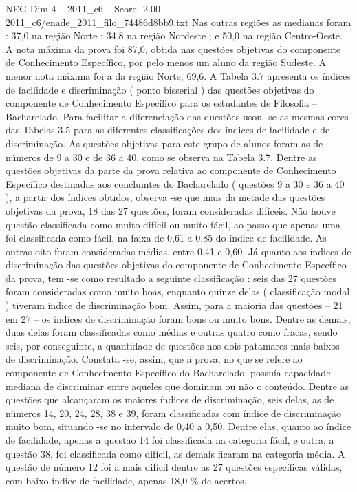 \begin{textsample}{NEG Dim 4 – 2011\_c6 – Score -2.00 – 2011\_c6/enade\_2011\_filo\_74486d8bb9.txt}
Nas outras regiões as medianas foram : 37,0 na região Norte ; 34,8 na região Nordeste ; e 50,0 na região Centro-Oeste.
A nota máxima da prova foi 87,0, obtida nas questões objetivas do componente de Conhecimento Específico, por pelo menos um aluno da região Sudeste.
A menor nota máxima foi a da região Norte, 69,6.
A Tabela 3.7 apresenta os índices de facilidade e discriminação ( ponto bisserial ) das questões objetivas do componente de Conhecimento Específico para os estudantes de Filosofia – Bacharelado.
Para facilitar a diferenciação das questões usou -se as mesmas cores das Tabelas 3.5 para as diferentes classificações dos índices de facilidade e de discriminação.
As questões objetivas para este grupo de alunos foram as de números de 9 a 30 e de 36 a 40, como se observa na Tabela 3.7.
Dentre as questões objetivas da parte da prova relativa ao componente de Conhecimento Específico destinadas aos concluintes do Bacharelado ( questões 9 a 30 e 36 a 40 ), a partir dos índices obtidos, observa -se que mais da metade das questões objetivas da prova, 18 das 27 questões, foram consideradas difíceis.
Não houve questão classificada como muito difícil ou muito fácil, ao passo que apenas uma foi classificada como fácil, na faixa de 0,61 a 0,85 do índice de facilidade.
As outras oito foram consideradas médias, entre 0,41 e 0,60.
Já quanto aos índices de discriminação das questões objetivas do componente de Conhecimento Específico da prova, tem -se como resultado a seguinte classificação : seis das 27 questões foram consideradas como muito boas, enquanto quinze delas ( classificação modal ) tiveram índice de discriminação bom.
Assim, para a maioria das questões – 21 em 27 – os índices de discriminação foram bons ou muito bons.
Dentre as demais, duas delas foram classificadas como médias e outras quatro como fracas, sendo seis, por conseguinte, a quantidade de questões nos dois patamares mais baixos de discriminação.
Constata -se, assim, que a prova, no que se refere ao componente de Conhecimento Específico do Bacharelado, possuía capacidade mediana de discriminar entre aqueles que dominam ou não o conteúdo.
Dentre as questões que alcançaram os maiores índices de discriminação, seis delas, as de números 14, 20, 24, 28, 38 e 39, foram classificadas com índice de discriminação muito bom, situando -se no intervalo de 0,40 a 0,50.
Dentre elas, quanto ao índice de facilidade, apenas a questão 14 foi classificada na categoria fácil, e outra, a questão 38, foi classificada como difícil, as demais ficaram na categoria média.
A questão de número 12 foi a mais difícil dentre as 27 questões específicas válidas, com baixo índice de facilidade, apenas 18,0 \% de acertos.

\end{textsample}
